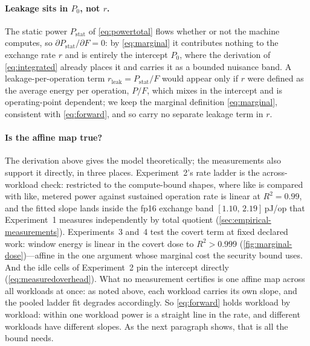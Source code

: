 \documentclass{article}
\theoremstyle{plain}
\theoremstyle{definition}
\theoremstyle{remark}
\begin{document}
\paragraph{Leakage sits in $P_0$, not $r$.}
The static power $P_{\mathrm{stat}}$ of \cref{eq:powertotal} flows whether
or not the machine computes, so
$\partial P_{\mathrm{stat}}/\partial F = 0$: by \cref{eq:marginal} it
contributes nothing to the exchange rate $r$ and is entirely the intercept
$P_0$, where the derivation of \cref{eq:integrated} already places it and
carries it as a bounded nuisance band. A leakage-per-operation term
$r_{\mathrm{leak}} = P_{\mathrm{stat}}/F$ would appear only if $r$ were
defined as the average energy per operation, $P/F$, which mixes in the
intercept and is operating-point dependent; we keep the marginal definition
\cref{eq:marginal}, consistent with \cref{eq:forward}, and so carry no
separate leakage term in $r$.

\paragraph{Is the affine map true?}
The derivation above gives the model theoretically; the measurements also
support it directly, in three places. Experiment~2's rate ladder is the
across-workload check: restricted to the compute-bound shapes, where like is
compared with like, metered power against sustained operation rate is linear
at $R^2 = 0.99$, and the fitted slope lands inside the fp16 exchange band
$[1.10,\,2.19]$\,pJ/op that Experiment~1 measures independently by total
quotient (\cref{sec:empirical-measurements}). Experiments~3 and~4 test the
covert term at fixed declared work: window energy is linear in the covert
dose to $R^2 > 0.999$ (\cref{fig:marginal-dose})---affine in the one
argument whose marginal cost the security bound uses. And the idle cells of
Experiment~2 pin the intercept directly (\cref{eq:measuredoverhead}). What
no measurement certifies is one affine map across all workloads at once:
as noted above, each workload carries its own slope, and the pooled ladder
fit degrades accordingly. So \cref{eq:forward} holds workload by workload:
within one workload power is a straight line in the rate, and different
workloads have different slopes. As the next paragraph shows, that is all
the bound needs.
\end{document}
